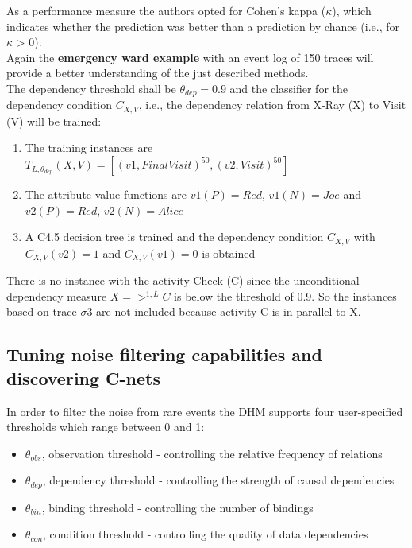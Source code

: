 \noindent As a performance measure the authors opted for Cohen’s kappa ($\kappa$), which indicates whether the prediction was better than a prediction by chance (i.e., for $\kappa$ > 0).\\

\noindent Again the \textbf{emergency ward example} with an event log of 150 traces will provide a better understanding of the just described methods.\\
\noindent The dependency threshold shall be $\theta_{dep} = 0.9$ and the classifier for the dependency condition $C_{X,V}$, i.e., the dependency relation from X-Ray (X) to Visit (V) will be trained:

\begin{enumerate}
\item The training instances are $T_{L,\theta_{dep}}(X,V ) = [(v1, Final Visit)^{50} , (v2, Visit)^{50} ]$
\item The attribute value functions are $v1 (P) = Red$, $v1 (N) = Joe$ and $v2(P) = Red$, $v2 (N) = Alice$ 
\item A C4.5 decision tree is trained and the dependency condition $C_{X,V}$ with $C_{X,V} (v2 ) = 1$ and $C_{X,V} (v1) = 0$ is obtained
\end{enumerate}

\noindent There is no instance with the activity Check (C) since the unconditional dependency measure $X => ^{1,L}C$ is below the threshold of 0.9. So the instances based on trace $\sigma 3$ are not included because activity C is in parallel to X.\protect\cite{Mannhardt17} 

\subsection{Tuning noise filtering capabilities and discovering C-nets}
In order to filter the noise from rare events the DHM supports four user-specified thresholds which range between 0 and 1:
\begin{itemize}
\item $\theta_{obs}$, observation threshold - controlling the relative frequency of relations
\item $\theta_{dep}$, dependency threshold - controlling the strength of causal dependencies
\item $\theta_{bin}$, binding threshold - controlling the number of bindings
\item $\theta_{con}$, condition threshold - controlling the quality of data dependencies
\end{itemize}

